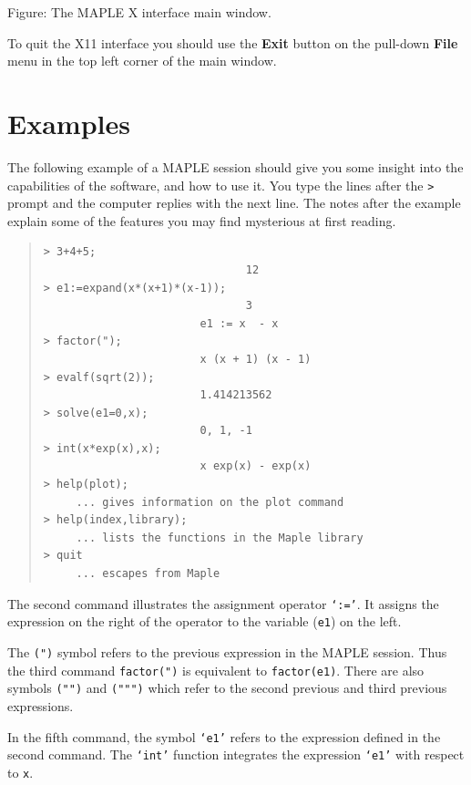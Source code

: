 \documentclass[twoside,11pt]{article}
\newcommand{\htmladdimg}[1]{}
\newcommand{\xlabel}[1]{}
\begin{document}
\begin{htmlonly}
\label{fig_main_window}
\htmladdimg{../sun107_f1.gif}

Figure: The MAPLE X interface main window.
\end{htmlonly}

To quit the X11 interface you should use the \textbf{Exit} button on the
pull-down \textbf{File} menu in the top left corner of the main window.

\section{Examples\xlabel{examples}}

The following example of a MAPLE session should give you some insight
into the capabilities of the software, and how to use it.  You type the
lines after the \verb+>+ prompt and the computer replies with the next line.
The notes after the example explain some of the features you may find
mysterious at first reading.

\begin{quote}\begin{verbatim}
> 3+4+5;
                               12
> e1:=expand(x*(x+1)*(x-1));
                               3
                        e1 := x  - x
> factor(");
                        x (x + 1) (x - 1)
> evalf(sqrt(2));
                        1.414213562
> solve(e1=0,x);
                        0, 1, -1
> int(x*exp(x),x);
                        x exp(x) - exp(x)
> help(plot);
     ... gives information on the plot command
> help(index,library);
     ... lists the functions in the Maple library
> quit
     ... escapes from Maple
\end{verbatim}\end{quote}

The second command illustrates the assignment operator \texttt{`:='}. It
assigns the expression on the right of the operator to the variable 
(\texttt{e1}) on the left.

The \texttt{(")} symbol refers to the previous expression in the MAPLE
session. Thus the third command \texttt{factor(")} is equivalent to
\texttt{factor(e1)}. There are also symbols \texttt{("")} and \texttt{(""")}
which refer to the second previous and third previous expressions.

In the fifth command, the symbol \texttt{`e1'} refers to the expression
defined in the second command. The \texttt{`int'} function integrates the
expression \texttt{`e1'} with respect to \texttt{x}.
\end{document}
